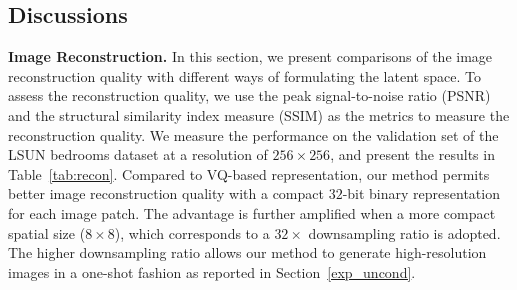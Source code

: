 \documentclass[10pt,twocolumn,letterpaper]{article}
\begin{document}
\subsection{Discussions}
\label{discuss}



\noindent \textbf{Image Reconstruction.}
In this section, we present comparisons of the image reconstruction quality with different ways of formulating the latent space.
To assess the reconstruction quality, we use the peak signal-to-noise ratio (PSNR) and the structural similarity index measure (SSIM) \cite{ssim} as the metrics to measure the reconstruction quality. We measure the performance on the validation set of the LSUN bedrooms dataset at a resolution of $256 \times 256$, and present the results in Table~\ref{tab:recon}.
Compared to VQ-based representation, our method permits better image reconstruction quality with a compact $32$-bit binary representation for each image patch. The advantage is further amplified when a more compact spatial size ($8 \times 8$), which corresponds to a $32\times$ downsampling ratio is adopted. The higher downsampling ratio allows our method to generate high-resolution images in a one-shot fashion as reported in Section~\ref{exp_uncond}.


\newcommand*{\x}{\mathsf{x}\mskip1mu}
\newcommand{\jj}{\scriptsize $\pm\text{  }$}
\end{document}
